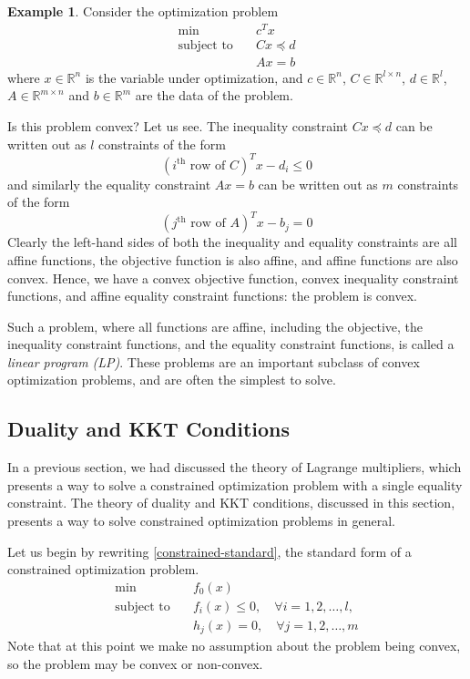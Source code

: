 \documentclass[a4paper]{article}
\theoremstyle{definition}
\newtheorem{example}{Example}[subsection]
\begin{document}
\begin{example}
	\label{linear-program-example}
	Consider the optimization problem
	\begin{align*}
		\min \quad & c^T x \\
		\text{subject to} \quad & Cx \preceq d \\
		& Ax = b
	\end{align*}
	where $x \in \mathbb{R}^n$ is the variable under optimization, and $c \in \mathbb{R}^n$, $C \in \mathbb{R}^{l \times n}$, $d \in \mathbb{R}^l$, $A \in \mathbb{R}^{m \times n}$ and $b \in \mathbb{R}^m$ are the data of the problem.

	Is this problem convex?
	Let us see.
	The inequality constraint $Cx \preceq d$ can be written out as $l$ constraints of the form
	\begin{equation*}
		(i^\text{th} \text{ row of } C)^T x - d_i \leq 0
	\end{equation*}
	and similarly the equality constraint $Ax = b$ can be written out as $m$ constraints of the form
	\begin{equation*}
		(j^\text{th} \text{ row of } A)^T x - b_j = 0
	\end{equation*}
	Clearly the left-hand sides of both the inequality and equality constraints are all affine functions, the objective function is also affine, and affine functions are also convex.
	Hence, we have a convex objective function, convex inequality constraint functions, and affine equality constraint functions: the problem is convex.

	Such a problem, where all functions are affine, including the objective, the inequality constraint functions, and the equality constraint functions, is called a \textit{linear program (LP)}.
	These problems are an important subclass of convex optimization problems, and are often the simplest to solve.
\end{example}

\subsection{Duality and KKT Conditions}

In a previous section, we had discussed the theory of Lagrange multipliers, which presents a way to solve a constrained optimization problem with a single equality constraint.
The theory of duality and KKT conditions, discussed in this section, presents a way to solve constrained optimization problems in general.

Let us begin by rewriting \eqref{constrained-standard}, the standard form of a constrained optimization problem.
\begin{align*}
	\min \quad & f_0(x) \\
	\text{subject to} \quad & f_i(x) \leq 0, \quad \forall i = 1, 2, \dots, l, \\
	& h_j(x) = 0, \quad \forall j = 1, 2, \dots, m
\end{align*}
Note that at this point we make no assumption about the problem being convex, so the problem may be convex or non-convex.
\end{document}
